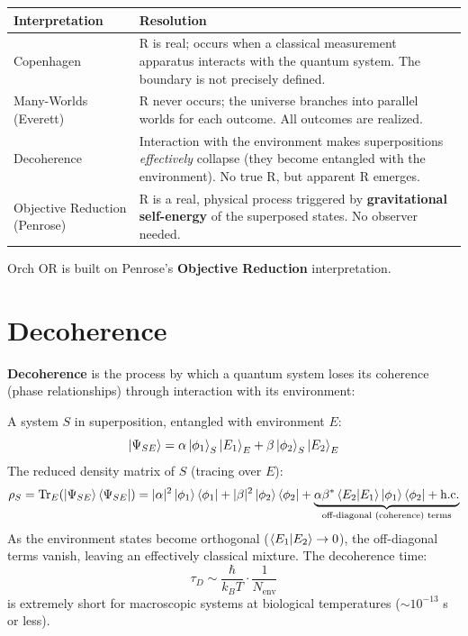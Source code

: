 \documentclass[11pt,a4paper]{report}
\begin{document}
\begin{center}
\renewcommand{\arraystretch}{1.3}
\begin{tabular}{>{\raggedright}p{3.5cm} >{\raggedright\arraybackslash}p{9.5cm}}
  \toprule
  \textbf{Interpretation} & \textbf{Resolution} \\
  \midrule
  Copenhagen & R is real; occurs when a classical measurement apparatus interacts with the quantum system. The boundary is not precisely defined. \\
  Many-Worlds (Everett) & R never occurs; the universe branches into parallel worlds for each outcome. All outcomes are realized. \\
  Decoherence & Interaction with the environment makes superpositions \emph{effectively} collapse (they become entangled with the environment). No true R, but apparent R emerges. \\
  Objective Reduction (Penrose) & R is a real, physical process triggered by \textbf{gravitational self-energy} of the superposed states. No observer needed. \\
  \bottomrule
\end{tabular}
\end{center}

Orch OR is built on Penrose's \textbf{Objective Reduction} interpretation.

\section{Decoherence}

\textbf{Decoherence} is the process by which a quantum system loses its coherence (phase relationships) through interaction with its environment:

\begin{mathbox}
\vspace{-6pt}
A system $S$ in superposition, entangled with environment $E$:
\[
  \ket{\Psi_{SE}} = \alpha\ket{\phi_1}_S\ket{E_1}_E + \beta\ket{\phi_2}_S\ket{E_2}_E
\]
The reduced density matrix of $S$ (tracing over $E$):
\[
  \rho_S = \text{Tr}_E\!\left(\ket{\Psi_{SE}}\bra{\Psi_{SE}}\right) = |\alpha|^2\ket{\phi_1}\bra{\phi_1} + |\beta|^2\ket{\phi_2}\bra{\phi_2} + \underbrace{\alpha\beta^*\braket{E_2|E_1}\ket{\phi_1}\bra{\phi_2} + \text{h.c.}}_{\text{off-diagonal (coherence) terms}}
\]
As the environment states become orthogonal ($\braket{E_1|E_2} \to 0$), the off-diagonal terms vanish, leaving an effectively classical mixture. The decoherence time:
\[
  \tau_D \sim \frac{\hbar}{k_B T} \cdot \frac{1}{N_{\text{env}}}
\]
is extremely short for macroscopic systems at biological temperatures ($\sim 10^{-13}$ s or less).
\vspace{-4pt}
\end{mathbox}
\end{document}

